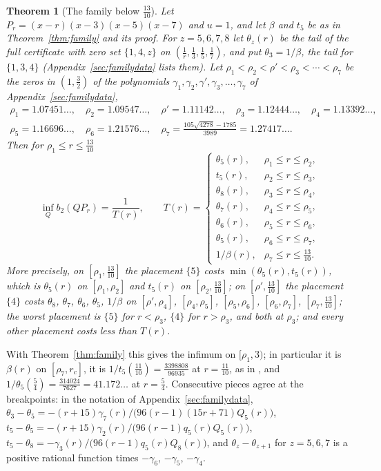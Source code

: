 \documentclass[11pt]{article}
\newtheorem{theorem}{Theorem}[section]
\begin{document}
\begin{theorem}[The family below $\tfrac{13}{10}$]\label{thm:familylow}
Let $P_r=(x-r)(x-3)(x-5)(x-7)$ and $u=1$, and let $\beta$ and $t_5$ be as
in Theorem~\ref{thm:family} and its proof.  For $z=5,6,7,8$ let
$\theta_z(r)$ be the tail of the full certificate with zero set $\{1,4,z\}$
on $(\tfrac1r,\tfrac13,\tfrac15,\tfrac17)$, and put $\theta_3=1/\beta$, the
tail for $\{1,3,4\}$ (Appendix~\ref{sec:familydata} lists them).  Let
$\rho_1<\rho_2<\rho'<\rho_3<\cdots<\rho_7$ be the zeros in
$(1,\tfrac32)$ of the polynomials
$\gamma_1,\gamma_2,\gamma',\gamma_3,\ldots,\gamma_7$ of
Appendix~\ref{sec:familydata},
\begin{gather*}
  \rho_1=1.07451\ldots,\quad \rho_2=1.09547\ldots,\quad
  \rho'=1.11142\ldots,\quad \rho_3=1.12444\ldots,\quad
  \rho_4=1.13392\ldots,\\
  \rho_5=1.16696\ldots,\quad \rho_6=1.21576\ldots,\quad
  \rho_7=\tfrac{105\sqrt{4278}-1785}{3989}=1.27417\ldots .
\end{gather*}
Then for $\rho_1\le r\le\tfrac{13}{10}$
\[
  \inf_Qb_2(QP_r)=\frac1{T(r)},\qquad
  T(r)=\begin{cases}
    \theta_5(r), & \rho_1\le r\le\rho_2,\\
    t_5(r), & \rho_2\le r\le\rho_3,\\
    \theta_8(r), & \rho_3\le r\le\rho_4,\\
    \theta_7(r), & \rho_4\le r\le\rho_5,\\
    \theta_6(r), & \rho_5\le r\le\rho_6,\\
    \theta_5(r), & \rho_6\le r\le\rho_7,\\
    1/\beta(r), & \rho_7\le r\le\tfrac{13}{10}.
  \end{cases}
\]
More precisely, on $[\rho_1,\tfrac{13}{10}]$ the placement $\{5\}$ costs
$\min(\theta_5(r),t_5(r))$, which is $\theta_5(r)$ on $[\rho_1,\rho_2]$ and
$t_5(r)$ on $[\rho_2,\tfrac{13}{10}]$; on $[\rho',\tfrac{13}{10}]$ the placement
$\{4\}$ costs $\theta_8$, $\theta_7$, $\theta_6$, $\theta_5$, $1/\beta$ on
$[\rho',\rho_4]$, $[\rho_4,\rho_5]$, $[\rho_5,\rho_6]$, $[\rho_6,\rho_7]$,
$[\rho_7,\tfrac{13}{10}]$; the worst placement is $\{5\}$ for $r<\rho_3$,
$\{4\}$ for $r>\rho_3$, and both at $\rho_3$; and every other placement costs
less than $T(r)$.
\end{theorem}

With Theorem~\ref{thm:family} this gives the infimum on $[\rho_1,3)$; in
particular it is $\beta(r)$ on $[\rho_7,r_c]$, it is
$1/t_5(\tfrac{11}{10})=\tfrac{3398808}{96935}$ at $r=\tfrac{11}{10}$, as in
\cite[Theorem~5.4]{coefficient-mass-attainment}, and $1/\theta_5(\tfrac54)=\tfrac{314024}{7627}=41.172\ldots$
at $r=\tfrac54$.  Consecutive pieces agree at the breakpoints: in the
notation of Appendix~\ref{sec:familydata},
$\theta_3-\theta_5=-(r+15)\gamma_7(r)/\bigl(96(r-1)(15r+71)Q_5(r)\bigr)$,
$t_5-\theta_5=-(r+15)\gamma_2(r)/\bigl(96(r-1)q_5(r)Q_5(r)\bigr)$,
$t_5-\theta_8=-\gamma_3(r)/\bigl(96(r-1)q_5(r)Q_8(r)\bigr)$, and $\theta_z-\theta_{z+1}$
for $z=5,6,7$ is a positive rational function times $-\gamma_6$, $-\gamma_5$,
$-\gamma_4$.
\end{document}
